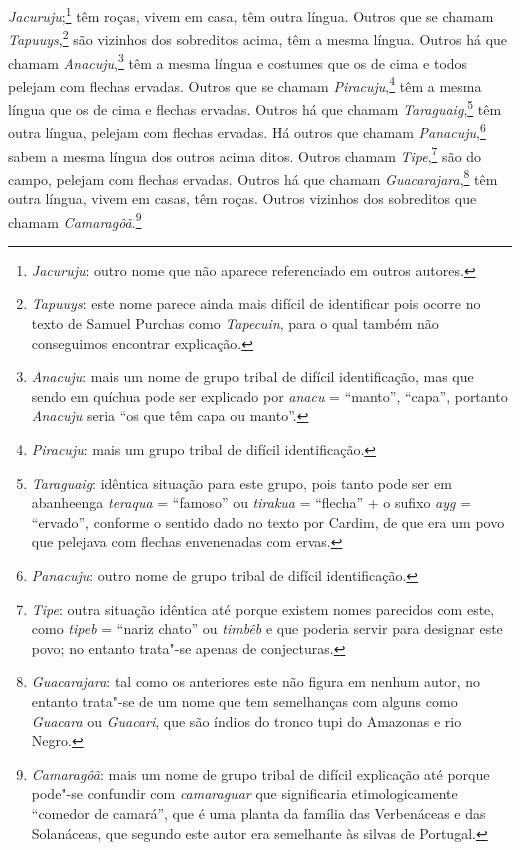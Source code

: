 \begin{linenumbers}
\textit{Jacuruju};\footnote{ \textit{Jacuruju}: outro nome que não
aparece referenciado em outros autores.} têm roças, vivem em
casa, têm outra língua. Outros que se chamam 
\textit{Tapuuys},\footnote{ \textit{Tapuuys}: este nome parece ainda mais difícil de
identificar pois ocorre no texto de Samuel Purchas como
\textit{Tapecuin}, para o qual também não conseguimos encontrar
explicação.} são vizinhos dos sobreditos acima, têm a mesma
língua. Outros há que chamam \textit{Anacuju},\footnote{ \textit{Anacuju}: mais um nome de grupo tribal de difícil
identificação, mas que sendo em quíchua pode ser explicado por
\textit{anacu} = ``manto'', ``capa'', portanto \textit{Anacuju} seria ``os
que têm capa ou manto''.} têm a mesma língua e costumes que
os de cima e todos pelejam com flechas ervadas. Outros que se chamam
\textit{Piracuju},\footnote{ \textit{Piracuju}: mais um grupo tribal
de difícil identificação.} têm a mesma língua que os de cima e
flechas ervadas. Outros há que chamam \textit{Taraguaig},\footnote{ \textit{Taraguaig}: idêntica situação para este grupo, pois tanto pode
ser em abanheenga \textit{teraqua} = ``famoso'' ou \textit{tirakua} = ``flecha'' + o sufixo \textit{ayg} = ``ervado'', conforme o sentido dado no
texto por Cardim, de que era um povo que pelejava com flechas
envenenadas com ervas.} têm outra língua, pelejam com flechas
ervadas. Há outros que chamam \textit{Panacuju},\footnote{ \textit{Panacuju}: outro nome de grupo tribal de difícil
identificação.} sabem a mesma língua dos outros acima ditos. Outros
chamam \textit{Tipe},\footnote{ \textit{Tipe}: outra situação
idêntica até porque existem nomes parecidos com este, como
\textit{tipeb} = ``nariz chato'' ou \textit{timbêb} e que poderia servir
para designar este povo; no entanto trata"-se apenas de
conjecturas.} são do campo, pelejam com flechas ervadas.
Outros há que chamam \textit{Guacarajara},\footnote{ \textit{Guacarajara}: tal como os anteriores este não figura em nenhum
autor, no entanto trata"-se de um nome que tem semelhanças com alguns
como \textit{Guacara} ou \textit{Guacari}, que são índios do tronco
tupi do Amazonas e rio Negro.} têm outra língua, vivem em
casas, têm roças. Outros vizinhos dos sobreditos que chamam
\textit{Camaragôã}.\footnote{ \textit{Camaragôã}: mais um nome de
grupo tribal de difícil explicação até porque pode"-se confundir com
\textit{camaraguar} que significaria etimologicamente ``comedor de
camará'', que é uma planta da família das Verbenáceas e das Solanáceas,
que segundo este autor era semelhante às silvas de Portugal.} 


\end{linenumbers}
